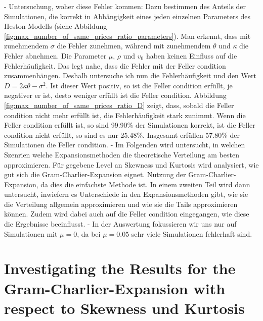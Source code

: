 - Untersuchung, woher diese Fehler kommen: Dazu bestimmen des Anteils der Simulationen, die korrekt in Abhängigkeit eines jeden einzelnen Parameters des Heston-Modells (siehe Abbildung \ref{fig:max_number_of_same_prices_ratio_parameters}). Man erkennt, dass mit zunehmendem $\sigma$ die Fehler zunehmen, während mit zunehmendem $\theta$ und $\kappa$ die Fehler abnehmen. Die Parameter $\mu$, $\rho$ und $v_0$ haben keinen Einfluss auf die Fehlerhäufigkeit. Das legt nahe, dass die Fehler mit der Feller condition zusammenhängen. Deshalb untersuche ich nun die Fehlerhäufigkeit und den Wert $D = 2\kappa\theta - \sigma^2$. Ist dieser Wert positiv, so ist die Feller condition erfüllt, je negativer er ist, desto weniger erfüllt ist die Feller condition. Abbildung \ref{fig:max_number_of_same_prices_ratio_D} zeigt, dass, sobald die Feller condition nicht mehr erfüllt ist, die Fehlerhäufigkeit stark zunimmt. Wenn die Feller condition erfüllt ist, so sind 99.90\% der Simulationen korrekt, ist die Feller condition nicht erfüllt, so sind es nur 25.48\%. Insgesamt erfüllen 57.80\% der Simulationen die Feller condition.
- Im Folgenden wird untersucht, in welchen Szenrien welche Expansionsmethoden die theoretische Verteilung am besten approximieren. Für gegebene Level an Skewness und Kurtosis wird analysiert, wie gut sich die Gram-Charlier-Expansion eignet. Nutzung der Gram-Charlier-Expansion, da dies die einfachste Methode ist. In einem zweiten Teil wird dann untersucht, inwiefern es Unterschiede in den Expansionsmethoden gibt, wie sie die Verteilung allgemein approximieren und wie sie die Tails approximieren können. Zudem wird dabei auch auf die Feller condition eingegangen, wie diese die Ergebnisse beeinflusst.
- In der Auswertung fokussieren wir uns nur auf Simulationen mit $\mu=0$, da bei $\mu=0.05$ sehr viele Simulationen fehlerhaft sind.

\section{Investigating the Results for the Gram-Charlier-Expansion with respect to Skewness und Kurtosis}

